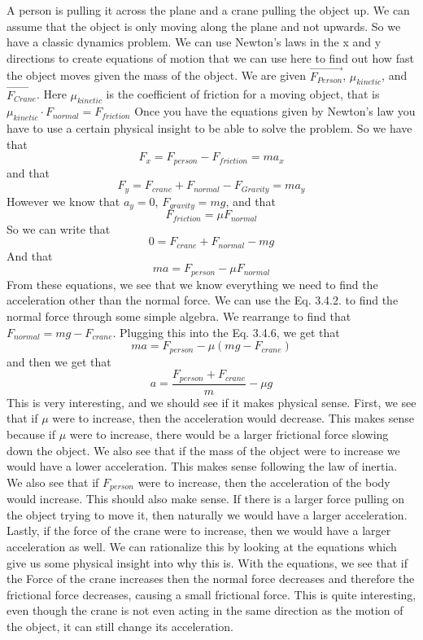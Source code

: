 \documentclass{article}[gray]
\numberwithin{equation}{subsection}
\begin{document}
A person is pulling it across the plane and a crane pulling the object up. We can assume that the object is only moving along the plane and not upwards. So we have a classic dynamics problem. We can use Newton’s laws in the x and y directions to create equations of motion that we can use here to find out how fast the object moves given the mass of the object. We are given $\vec{F_{Person}}$, $\mu_{kinetic}$, and $\vec{F_{Crane}}$. Here $\mu_{kinetic}$ is the coefficient of friction for a moving object, that is $\mu_{kinetic}\cdot F_{normal} = F_{friction}$ Once you have the equations given by Newton's law you have to use a certain physical insight to be able to solve the problem. So we have that \begin{equation}F_x=F_{person}-F_{friction}=ma_x\end{equation} and that \begin{equation}F_y=F_{crane}+F_{normal}-F_{Gravity}=ma_y\end{equation} However we know that $a_y=0$, $F_{gravity}=mg$, and that \begin{equation}F_{friction} =\mu F_{normal}\end{equation} So we can write that \begin{equation}0=F_{crane}+F_{normal}-mg\end{equation} And that \begin{equation}ma=F_{person}-\mu F_{normal}\end{equation} From these equations, we see that we know everything we need to find the acceleration other than the normal force. We can use the Eq. 3.4.2. to find the normal force through some simple algebra. We rearrange to find that $F_{normal}= mg-F_{crane}$. Plugging this into the Eq. 3.4.6, we get that \begin{equation}ma=F_{person}-\mu\left(mg-F_{crane}\right)\end{equation} and then we get that \begin{equation}a = \frac{F_{person}+F_{crane}}{m}-\mu g\end{equation} This is very interesting, and we should see if it makes physical sense. First, we see that if $\mu$ were to increase, then the acceleration would decrease. This makes sense because if $\mu$ were to increase, there would be a larger frictional force slowing down the object. We also see that if the mass of the object were to increase we would have a lower acceleration. This makes sense following the law of inertia. We also see that if $F_{person}$ were to increase, then the acceleration of the body would increase. This should also make sense. If there is a larger force pulling on the object trying to move it, then naturally we would have a larger acceleration. Lastly, if the force of the crane were to increase, then we would have a larger acceleration as well. We can rationalize this by looking at the equations which give us some physical insight into why this is. With the equations, we see that if the Force of the crane increases then the normal force decreases and therefore the frictional force decreases, causing a small frictional force. This is quite interesting, even though the crane is not even acting in the same direction as the motion of the object, it can still change its acceleration. 
\end{document}
